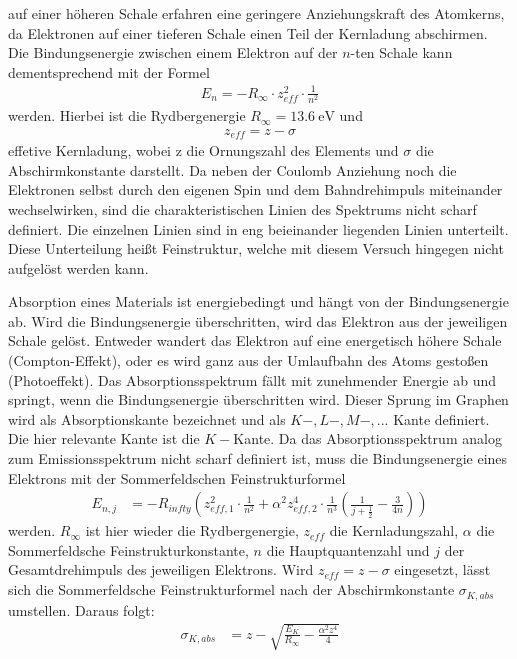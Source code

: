 \justifying auf einer höheren Schale erfahren eine geringere Anziehungskraft des Atomkerns, da Elektronen auf einer tieferen
Schale einen Teil der Kernladung abschirmen. Die Bindungsenergie zwischen einem Elektron auf der $n$-ten Schale kann dementsprechend mit der 
Formel \cite{V602}
\begin{align}
    E_n = -R_{\infty}\cdot z_{eff}^2 \cdot \frac{1}{n^2} \label{eq:1}
\end{align}
\justifying werden. Hierbei ist die Rydbergenergie $R_{\infty}=\SI{13.6}{\electronvolt}$ und 
\begin{align}
    z_{eff}=z-\sigma \label{eq:2}
\end{align}
\justifying effetive Kernladung, wobei z die Ornungszahl des Elements und $\sigma$ die Abschirmkonstante darstellt. 
Da neben der Coulomb Anziehung noch die Elektronen selbst durch den eigenen Spin und dem Bahndrehimpuls miteinander wechselwirken, sind die
charakteristischen Linien des Spektrums nicht scharf definiert. Die einzelnen Linien sind in eng beieinander liegenden Linien unterteilt. Diese 
Unterteilung heißt Feinstruktur, welche mit diesem Versuch hingegen nicht aufgelöst werden kann. 

\justifying Absorption eines Materials ist energiebedingt und hängt von der Bindungsenergie ab. Wird die Bindungsenergie 
überschritten, wird das Elektron aus der jeweiligen Schale gelöst. Entweder wandert das Elektron auf eine energetisch höhere Schale (Compton-Effekt),
oder es wird ganz aus der Umlaufbahn des Atoms gestoßen (Photoeffekt). Das Absorptionsspektrum fällt mit zunehmender Energie ab und springt, wenn
die Bindungsenergie überschritten wird. Dieser Sprung im Graphen wird als Absorptionskante bezeichnet und als $K-, L-, M-,...$ Kante definiert. 
Die hier relevante Kante ist die $K-$Kante. Da das Absorptionsspektrum analog zum Emissionsspektrum nicht scharf definiert ist, muss die Bindungsenergie
eines Elektrons mit der Sommerfeldschen Feinstrukturformel \cite{V602} 
\begin{align}
    E_{n,j} &= -R_{infty} \left( z_{eff,1}^2 \cdot \frac{1}{n^2} + \alpha^2 z_{eff,2}^4 \cdot \frac{1}{n^3} \left( \frac{1}{j+\frac{1}{2}} - \frac{3}{4n} \right) \right) \label{eq:3}
\end{align}
\justifying werden. $R_{\infty}$ ist hier wieder die Rydbergenergie, $z_{eff}$ die Kernladungszahl, $\alpha$ die 
Sommerfeldsche Feinstrukturkonstante, $n$ die Hauptquantenzahl und $j$ der Gesamtdrehimpuls des jeweiligen Elektrons. Wird $z_{eff}=z-\sigma$
eingesetzt, lässt sich die Sommerfeldsche Feinstrukturformel nach der Abschirmkonstante $\sigma_{K,abs}$ umstellen. Daraus folgt: \cite{V602}
\begin{align}
    \sigma_{K,abs} &= z - \sqrt{\frac{E_K}{R_{\infty}} - \frac{\alpha^2 z^4}{4}} \label{eq:4}
\end{align}

